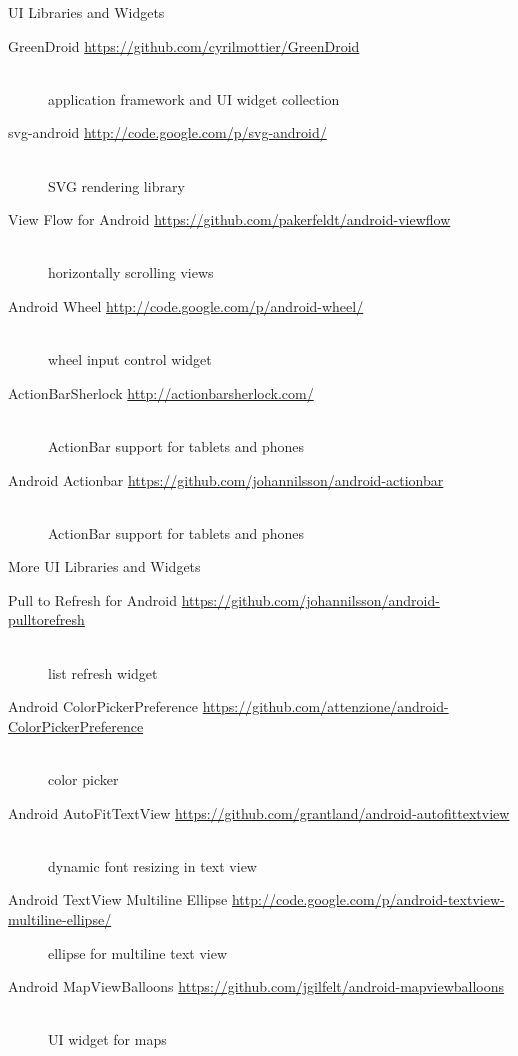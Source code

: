 \documentclass[aspectratio=169]{beamer}
\newcommand{\surl}[1] {{\tiny \url{#1}}}
\begin{document}
    \begin{frame}{UI Libraries and Widgets}
      \begin{description}
        \item[GreenDroid \surl{https://github.com/cyrilmottier/GreenDroid}] \hfill \\ application framework and UI widget collection
        \item[svg-android \surl{http://code.google.com/p/svg-android/}] \hfill \\ SVG rendering library
        \item[View Flow for Android \surl{https://github.com/pakerfeldt/android-viewflow}] \hfill \\ horizontally scrolling views
        \item[Android Wheel \surl{http://code.google.com/p/android-wheel/}] \hfill \\ wheel input control widget
        \item[ActionBarSherlock \surl{http://actionbarsherlock.com/}]  \hfill \\ ActionBar support for tablets and phones
        \item[Android Actionbar \surl{https://github.com/johannilsson/android-actionbar}] \hfill \\ ActionBar support for tablets and phones
      \end{description}
    \end{frame}

    \begin{frame}{More UI Libraries and Widgets}
      \begin{description}        
        \item[Pull to Refresh for Android \surl{https://github.com/johannilsson/android-pulltorefresh}] \hfill \\ list refresh widget
        \item[Android ColorPickerPreference \surl{https://github.com/attenzione/android-ColorPickerPreference}] \hfill \\ color picker
        \item[Android AutoFitTextView \surl{https://github.com/grantland/android-autofittextview}] \hfill \\ dynamic font resizing in text view
        \item[Android TextView Multiline Ellipse \surl{http://code.google.com/p/android-textview-multiline-ellipse/}] ellipse for multiline text view
        \item[Android MapViewBalloons \surl{https://github.com/jgilfelt/android-mapviewballoons}] \hfill \\ UI widget for maps
      \end{description}
    \end{frame}
\end{document}
